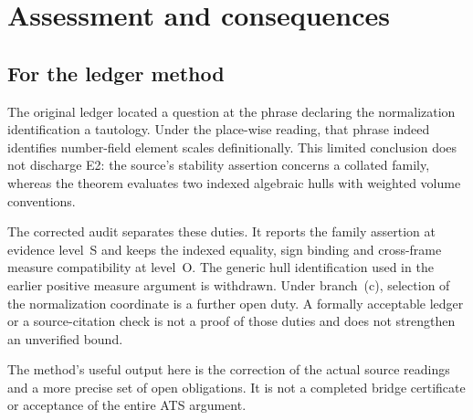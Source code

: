 \documentclass[11pt,a4paper]{article}
\theoremstyle{definition}
\theoremstyle{plain}
\theoremstyle{definition}
\begin{document}
\section{Assessment and consequences}
\label{sec:assessment}

\subsection{For the ledger method}

The original ledger located a question at the phrase declaring the
normalization identification a tautology. Under the place-wise reading,
that phrase indeed identifies number-field element scales definitionally.
This limited conclusion does not discharge E2: the source's stability
assertion concerns a collated family, whereas the theorem evaluates two
indexed algebraic hulls with weighted volume conventions.

The corrected audit separates these duties. It reports the family assertion
at evidence level~S and keeps the indexed equality, sign binding and
cross-frame measure compatibility at level~O. The generic hull identification
used in the earlier positive measure argument is withdrawn.
Under branch~(c), selection of the normalization coordinate is a further
open duty. A formally acceptable ledger or a source-citation check is not
a proof of those duties and does not strengthen an unverified bound.

The method's useful output here is the correction of the actual source
readings and a more precise set of open obligations. It is not a completed
bridge certificate or acceptance of the entire ATS argument.
\end{document}

